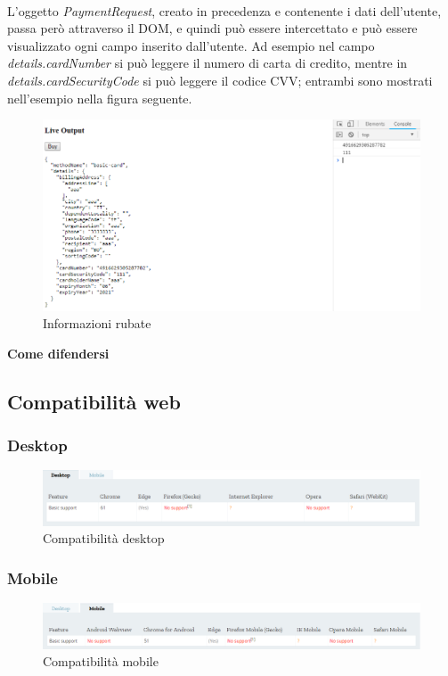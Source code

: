 \documentclass[11pt ,a4paper , twoside , openright ]{article}
\begin{document}
\\
\pagebreak
L'oggetto \textit{PaymentRequest}, creato in precedenza e contenente i dati dell'utente, passa però attraverso il DOM, e quindi può essere intercettato e può essere visualizzato ogni campo inserito dall'utente. Ad esempio nel campo \textit{details.cardNumber} si può leggere il numero di carta di credito, mentre in \textit{details.cardSecurityCode} si può leggere il codice CVV; entrambi sono mostrati nell'esempio nella figura seguente.
\begin{figure}[h]
	\centering
	\includegraphics[width=1\linewidth]{Informazioni}
	\caption{Informazioni rubate}
	\label{fig: Informazioni rubate}
\end{figure}

\textbf{Come difendersi}

\pagebreak

\subsection{Compatibilità web}
\subsubsection{Desktop}
\begin{figure}[h]
	\centering
	\includegraphics[width=1\linewidth]{Compatibilita1}
	\caption{Compatibilità desktop}
	\label{fig: Compatibilità desktop}
\end{figure}
\subsubsection{Mobile}
\begin{figure}[h]
	\centering
	\includegraphics[width=1\linewidth]{Compatibilita2}
	\caption{Compatibilità mobile}
	\label{fig: Compatibilità mobile}
\end{figure}
\end{document}
